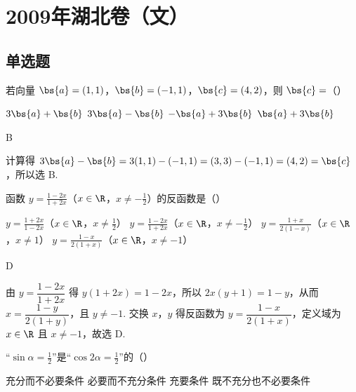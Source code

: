 \chapter{2009年湖北卷（文）}

\section{单选题}

\begin{problem}
若向量 \(\bs{a} = \left(1,1\right)\)，\(\bs{b} = \left(-1,1\right)\)，\(\bs{c} = \left(4,2\right)\)，则 \(\bs{c} =\)（\quad）

\choices
    {\(3\bs{a} + \bs{b}\)}
    {\(3\bs{a} - \bs{b}\)}
    {\(-\bs{a} + 3\bs{b}\)}
    {\(\bs{a} + 3\bs{b}\)}
\end{problem}

\begin{answer}
B
\end{answer}

\begin{solution}
计算得 \(3\bs{a}-\bs{b}=3(1,1)-(-1,1)=(3,3)-(-1,1)=(4,2)=\bs{c}\)，所以选 B.
\end{solution}

\begin{problem}
函数 \( y = \frac{1 - 2x}{1 + 2x} \)（\(x \in \R\)，\(x \neq -\frac{1}{2}\)）的反函数是（\quad）

\choices
    {\( y = \frac{1 + 2x}{1 - 2x} \)（\(x \in \R\)，\(x \neq \frac{1}{2}\)）}
    {\( y = \frac{1 - 2x}{1 + 2x} \)（\(x \in \R\)，\(x \neq -\frac{1}{2}\)）}
    {\( y = \frac{1 + x}{2\left(1 - x\right)} \)（\(x \in \R\)，\(x \neq 1\)）}
    {\( y = \frac{1 - x}{2\left(1 + x\right)} \)（\(x \in \R\)，\(x \neq -1\)）}
\end{problem}

\begin{answer}
D
\end{answer}

\begin{solution}
由 \(y=\dfrac{1-2x}{1+2x}\) 得 \(y(1+2x)=1-2x\)，所以 \(2x(y+1)=1-y\)，从而 \(x=\dfrac{1-y}{2(1+y)}\)，且 \(y\neq-1\). 交换 \(x\)，\(y\) 得反函数为 \(y=\dfrac{1-x}{2(1+x)}\)，定义域为 \(x\in\R\) 且 \(x\neq-1\)，故选 D.
\end{solution}

\begin{problem}
“\(\sin \alpha = \frac{1}{2}\)”是“\(\cos 2\alpha = \frac{1}{2}\)”的（\quad）

\choices
    {充分而不必要条件}
    {必要而不充分条件}
    {充要条件}
    {既不充分也不必要条件}
\end{problem}

